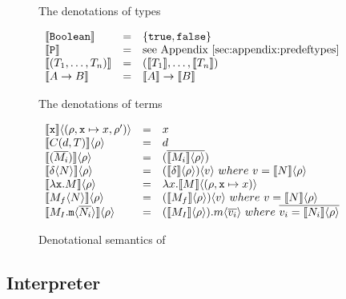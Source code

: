 \begin{figure}[h]
\caption{Denotational semantics of \corelang}
\label{fig:denotations}
The denotations of \corelang types

\begin{center}
  \(\begin{array}{ l c l }
  \Denot{\lst{Boolean}} & = & \{ \lst{true}, \lst{false} \}  \\	
  \Denot{\lst{P}} & = & \text{see Appendix~\ref{sec:appendix:predeftypes}} \\	
  \Denot{(T_1,\dots,T_n)} & = & (\Denot{T_1},\dots,\Denot{T_n})  \\	
  \Denot{A \to B} & = & \Denot{A} \to \Denot{B}  \\	
  \end{array}\)
\end{center}

The denotations of \corelang terms

\begin{center}
  \(\begin{array}{ l c l }
  \Apply{ \Denot{\lst{x}}			}{(\rho,\lst{x}\mapsto x, \rho')} & = & x \\	
  \Apply{ \Denot{C(d, T)} 			}{\rho} & = & d \\	
  \Apply{ \Denot{(\Ov{M_i})} 		}{\rho} & = & (\Ov{ \Apply{\Denot{M_i}}{\rho} }) \\	

  \Apply{ \Denot{\Apply{\delta}{N}} }{\rho} & = 
		& \Apply{ (\Apply{\Denot{\delta}}{\rho}) }{ v }~where~v = \Apply{\Denot{N}}{\rho} \\	

  \Apply{ \Denot{\Lam{\lst{x}}{M}}	}{\rho} & = 
		& \Lam{x}{ \Apply{\Denot{M}}{(\rho, \lst{x}\mapsto x)} } \\	

  \Apply{ \Denot{\Apply{M_f}{N}}	}{\rho} & = 
		& \Apply{ (\Apply{\Denot{M_f}}{\rho}) }{ v }~where~v = \Apply{\Denot{N}}{\rho} \\	

  \Apply{ \Denot{ \Apply{M_I.\lst{m}}{\Ov{N_i}} }	}{\rho} & = 
		& \Apply{ (\Apply{\Denot{M_I}}{\rho}).m }{ \Ov{v_i} }~where~\Ov{v_i = \Apply{\Denot{N_i}}{\rho}} \\	
  \end{array}\)
\end{center}
\end{figure}

\subsection{Interpreter}
\label{sec:evaluation:interpreter}